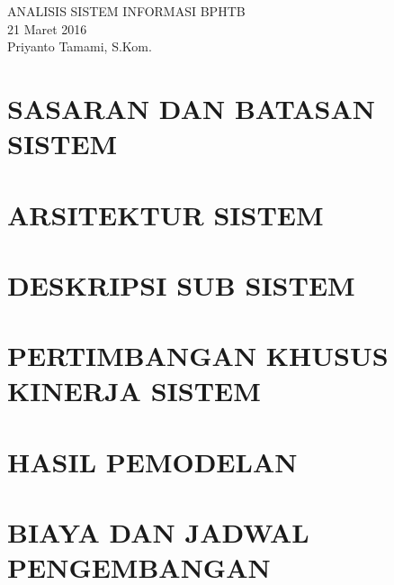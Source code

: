 \documentclass[pdftex,12pt, oneside]{article}
\begin{document}

%
\begin{center}
{\large ANALISIS SISTEM INFORMASI BPHTB}
\\[1cm]
21 Maret 2016\\
Priyanto Tamami, S.Kom.
\end{center}


%
%

% 


%
%
%
%

%
%
%
% 
% 
% 

%
%


\section{SASARAN DAN BATASAN SISTEM}


\section{ARSITEKTUR SISTEM}


\section{DESKRIPSI SUB SISTEM}


\section{PERTIMBANGAN KHUSUS KINERJA SISTEM}


\section{HASIL PEMODELAN}


\section{BIAYA DAN JADWAL PENGEMBANGAN}
\end{document}
